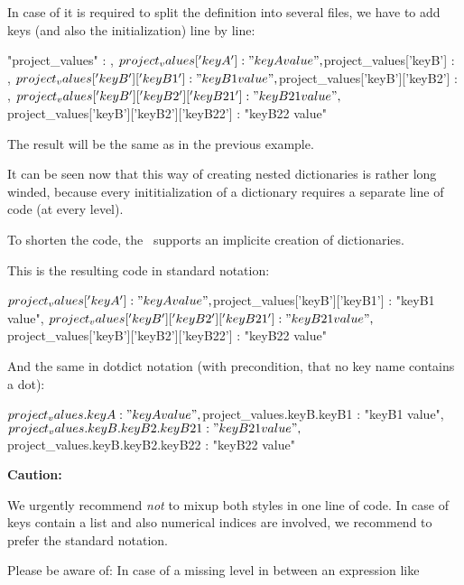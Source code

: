 In case of it is required to split the definition into several files, we have to add keys (and also the initialization) line by line:

\begin{pythoncode}
{
   "project_values" : {},
   ${project_values}['keyA'] : "keyA value",
   ${project_values}['keyB'] : {},
   ${project_values}['keyB']['keyB1'] : "keyB1 value",
   ${project_values}['keyB']['keyB2'] : {},
   ${project_values}['keyB']['keyB2']['keyB21'] : "keyB21 value",
   ${project_values}['keyB']['keyB2']['keyB22'] : "keyB22 value"
}
\end{pythoncode}

The result will be the same as in the previous example.

It can be seen now that this way of creating nested dictionaries is rather long winded, because every inititialization of a dictionary
requires a separate line of code (at every level).

To shorten the code, the \pkg\ supports an implicite creation of dictionaries.

This is the resulting code in standard notation:

\begin{pythoncode}
{
   ${project_values}['keyA'] : "keyA value",
   ${project_values}['keyB']['keyB1'] : "keyB1 value",
   ${project_values}['keyB']['keyB2']['keyB21'] : "keyB21 value",
   ${project_values}['keyB']['keyB2']['keyB22'] : "keyB22 value"
}
\end{pythoncode}

\vspace{2ex}

And the same in dotdict notation (with precondition, that no key name contains a dot):

\begin{pythoncode}
{
   ${project_values.keyA} : "keyA value",
   ${project_values.keyB.keyB1} : "keyB1 value",
   ${project_values.keyB.keyB2.keyB21} : "keyB21 value",
   ${project_values.keyB.keyB2.keyB22} : "keyB22 value"
}
\end{pythoncode}

\vspace{2ex}

\textbf{Caution:}

We urgently recommend \textit{not} to mixup both styles in one line of code. In case of keys contain a list and also numerical indices are involved,
we recommend to prefer the standard notation. 

Please be aware of: In case of a missing level in between an expression like 

